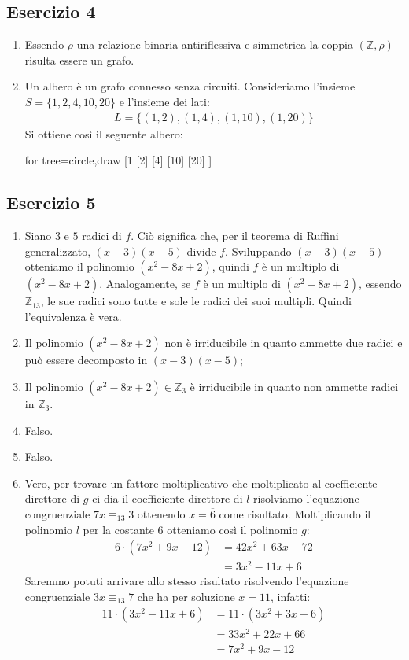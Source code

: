 \subsection*{Esercizio 4}
\begin{enumerate}
	\item Essendo $\rho$ una relazione binaria antiriflessiva e simmetrica la coppia $(\mathbb{Z},\rho)$ risulta essere un grafo.
	\item Un albero è un grafo connesso senza circuiti. Consideriamo l'insieme $S=\{1,2,4,10,20\}$ e l'insieme dei lati:
	\begin{align*}
		L = \{(1,2),(1,4),(1,10),(1,20)\}
	\end{align*}
Si ottiene così il seguente albero:
\begin{center}
	\begin{forest}
	for tree={circle,draw}
		[1
			[2]
			[4]
			[10]
			[20]
		]
	\end{forest}
\end{center}
\end{enumerate}

\subsection*{Esercizio 5}
\begin{enumerate}[label=(\textit{\roman*})]
	\item Siano $\overline{3}$ e $\overline{5}$ radici di $f$. Ciò significa che, per il teorema di Ruffini generalizzato, $(x-3)(x-5)$ divide $f$. Sviluppando $(x-3)(x-5)$ otteniamo il polinomio $(x^{2}-8x+2)$, quindi $f$ è un multiplo di $(x^{2}-8x+2)$. Analogamente, se $f$ è un multiplo di $(x^{2}-8x+2)$, essendo $\mathbb{Z}_{13}$, le sue radici sono tutte e sole le radici dei suoi multipli. Quindi l'equivalenza è vera.
	\item Il polinomio $(x^{2}-8x+2)$ non è irriducibile in quanto ammette due radici e può essere decomposto in $(x-3)(x-5)$;
	\item Il polinomio $(x^{2}-8x+2) \in \mathbb{Z}_{3}$ è irriducibile in quanto non ammette radici in $\mathbb{Z}_{3}$.
	\item Falso.
	\item  Falso.
	\item Vero, per trovare un fattore moltiplicativo che moltiplicato al coefficiente direttore di $g$ ci dia il coefficiente direttore di $l$ risolviamo l'equazione congruenziale $7x\equiv_{13} 3$ ottenendo $x=\overline{6}$ come risultato. Moltiplicando il polinomio $l$ per la costante $6$  otteniamo così il polinomio $g$:
	\begin{align*}
		6 \cdot (7x^{2} +9x -12) &= 42x^{2}+63x-72 \\
		&= 3x^{2}-11x+6
	\end{align*}
Saremmo potuti arrivare allo stesso risultato risolvendo l'equazione congruenziale $3x \equiv_{13} 7$ che ha per soluzione $x=11$, infatti:
\begin{align*}
	11 \cdot (3x^{2}-11x+6) &= 11 \cdot (3x^{2}+3x+6) \\
	&= 33x^{2} +22x +66 \\
	&= 7x^{2}+9x-12
\end{align*}
\end{enumerate}
